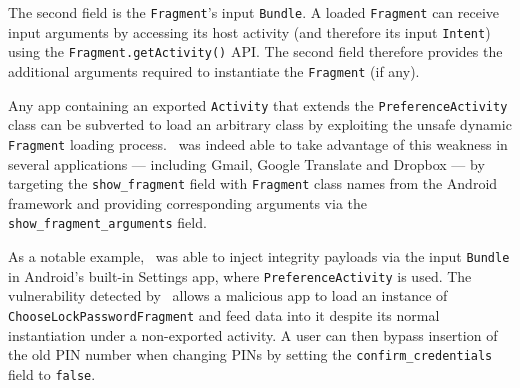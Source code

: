The second field is the \texttt{Fragment}'s input {\tt Bundle}. A loaded \texttt{Fragment} can
receive input arguments by accessing its host activity (and therefore
its input \texttt{Intent}) using the \texttt{Fragment.getActivity()} API. The second field therefore provides the additional arguments required to instantiate the {\tt Fragment} (if any).

Any app containing an exported {\tt Activity} that extends the {\tt PreferenceActivity} class can be subverted to load an arbitrary class
by exploiting the unsafe dynamic {\tt Fragment} loading process. \Tool\ was indeed able to take advantage of this weakness
in several applications --- including Gmail, Google Translate and Dropbox --- by
targeting the \texttt{show\_fragment}  field with {\tt Fragment} class names from the Android framework and providing corresponding arguments via the \texttt{show\_fragment\_arguments} field. 


As a notable example, \Tool\ was able to inject integrity payloads via the input {\tt Bundle} in Android's built-in Settings app, where {\tt PreferenceActivity} is used. 
The vulnerability detected by \Tool\ allows a malicious app to load an instance of \texttt{ChooseLockPasswordFragment}
and feed data into it despite its normal instantiation under a non-exported
activity. A user can then bypass insertion of the old PIN number when changing PINs by setting the \texttt{confirm\_credentials} field to \texttt{false}.


